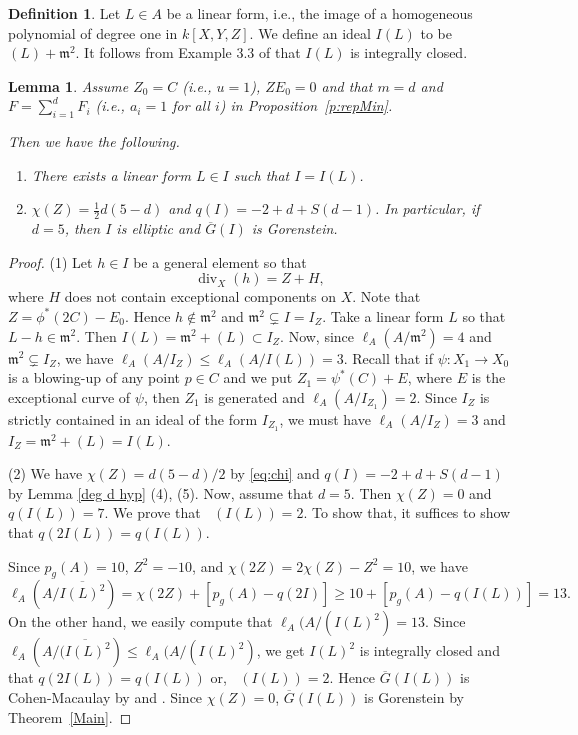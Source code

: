 \documentclass[12pt]{amsart}
\newtheorem{lem}[thm]{Lemma}
\theoremstyle{definition}
\newtheorem{defn}[thm]{Definition}
\theoremstyle{remark}
\numberwithin{equation}{section}
\newcommand{\thmref}[1]{Theorem~\ref{#1}}
\newcommand{\proref}[1]{Proposition~\ref{#1}}
\DeclareMathOperator{\di}{div}
\DeclareMathOperator{\br}{\bar r}
\newcommand{\m}{\mathfrak m}
\renewcommand{\:}{\colon}
\newcommand{\ol}[1]{\overline {#1}}
\begin{document}
\begin{defn}\label{I(L)def}
Let $L\in A$ be a linear form, i.e., the image of a homogeneous polynomial of degree one in $k[X,Y,Z]$. 
We define an ideal $I(L)$ to be $(L)+\m^2$. 
It follows from Example 3.3 of \cite{Wt3} that $I(L)$ is integrally closed.
\end{defn}

\begin{lem}
\label{l:Lm}
Assume $Z_0=C$  (i.e., $u=1$), $ZE_0=0$ and that $m=d$ and $F=\sum_{i=1}^dF_i$ (i.e., $a_i=1$ for all $i$) in \proref{p:repMin}.

Then we have the following.

\begin{enumerate}
\item There exists a linear form $L\in I$  such that $I = I(L)$. 
\item $\chi(Z )=\frac{1}{2} d (5-d)$ and 
 $q(I)=-2 + d+ S(d-1)$.
In particular, if $d=5$, then $I$ is elliptic and $\ol G(I)$ is Gorenstein. 
\end{enumerate}
\end{lem}

\begin{proof}
(1)
Let $h\in I$ be a general element so that 
\[\di_X (h) = Z + H,\]
where $H$ does not contain exceptional components on $X$.
Note that $Z =  \phi^*(2C) - E_0$. Hence $h \not\in \m^2$ and $\m^2\subsetneq I=I_Z$. 
Take a linear form $L$ so that $L - h \in \m^2$.
Then 
$I(L) = \m^2 + (L) \subset I_Z$. 
Now, since $\ell_A(A/\m^2)=4$ and $\m^2 \subsetneq I_Z$, 
we have $\ell_A(A/I_Z) \le \ell_A(A/I(L)) = 3$. 
Recall that if $\psi : X_1\to X_0$ is a blowing-up of any point $p\in C$ and we put 
$Z_1 = \psi^*(C) + E$, where $E$ is the exceptional curve of $\psi$, then 
$Z_1$ is generated and $\ell_A(A/I_{Z_1})=2$. Since $I_Z$ is strictly contained in an 
ideal of the form $I_{Z_1}$, we must have $\ell_A(A/I_Z) = 3$ and $I_Z = \m^2 + (L)= I(L)$.   
\par
(2) We have $\chi(Z) =  d(5 -d)/2$ by \eqref{eq:chi} and  $q(I)=-2 + d+ S(d-1)$ by Lemma \ref{deg d hyp} (4), (5).
Now, assume that $d=5$. Then $\chi(Z) =0$ and $q( I(L)) =7$. 
We prove that $\br(I(L))=2$.
To show that, it suffices to show that 
$q( 2 I(L)) = q(I(L))$. \par
Since $p_g(A)=10$, $Z^2= -10$, and $\chi(2 Z) = 2 \chi(Z) - Z^2 = 10$, 
 we have 
\[\ell_A( A/ \overline{I(L)^2}) =  \chi(2Z) + [p_g(A) -q(2I)] \ge 10 + [p_g(A) - q(I(L))]=13.\]  
On the other hand, we easily compute that $\ell_A( A/ (I(L)^2) = 13$. 
Since $\ell_A(A/ \overline{(I(L)^2}) \le \ell_A( A/ (I(L)^2)$, we get 
$I(L)^2$ is integrally closed and that $q(2 I(L)) = q(I(L))$ or, $\br(I(L))=2$.   Hence $\ol G(I(L))$ is Cohen-Macaulay  by \cite{M} and \cite{Hun}.
Since $\chi(Z)=0$,  $\ol G(I(L))$ is Gorenstein by \thmref{Main}.
\end{proof}
\end{document}
